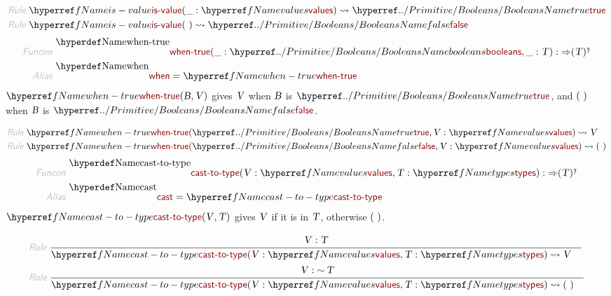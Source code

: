 \begin{align*}
  \KEY{Rule} ~ 
    & \NAMEREF{is-value}
        ( \_ : \NAMEREF{values} ) \leadsto
        \NAMEHYPER{../Primitive}{Booleans}{true}
\\
  \KEY{Rule} ~ 
    & \NAMEREF{is-value}
        (  ~  ) \leadsto
        \NAMEHYPER{../Primitive}{Booleans}{false}
\end{align*}
\begin{align*}
  \KEY{Funcon} ~ 
  & \NAMEDECL{when-true}(\_ : \NAMEHYPER{../Primitive}{Booleans}{booleans}, \_ : \VAR{T}) :  \TO ( \VAR{T} )\QUERY
\\
  \KEY{Alias} ~ 
  & \NAMEDECL{when} = \NAMEREF{when-true}
\end{align*}
$\SHADE{\NAMEREF{when-true}
           ( \VAR{B},   
             \VAR{V} )}$ gives $\SHADE{\VAR{V}}$ when $\SHADE{\VAR{B}}$ is $\SHADE{\NAMEHYPER{../Primitive}{Booleans}{true}}$, and $\strut(  ~  )\strut$ when $\SHADE{\VAR{B}}$ is $\SHADE{\NAMEHYPER{../Primitive}{Booleans}{false}}$.

\begin{align*}
  \KEY{Rule} ~ 
    & \NAMEREF{when-true}
        ( \NAMEHYPER{../Primitive}{Booleans}{true},   
          \VAR{V} : \NAMEREF{values} ) \leadsto
        \VAR{V}
\\
  \KEY{Rule} ~ 
    & \NAMEREF{when-true}
        ( \NAMEHYPER{../Primitive}{Booleans}{false},   
          \VAR{V} : \NAMEREF{values} ) \leadsto
        (  ~  )
\end{align*}
\begin{align*}
  \KEY{Funcon} ~ 
  & \NAMEDECL{cast-to-type}(\VAR{V} : \NAMEREF{values}, \VAR{T} : \NAMEREF{types}) :  \TO ( \VAR{T} )\QUERY
\\
  \KEY{Alias} ~ 
  & \NAMEDECL{cast} = \NAMEREF{cast-to-type}
\end{align*}
$\SHADE{\NAMEREF{cast-to-type}
           ( \VAR{V},   
             \VAR{T} )}$ gives $\SHADE{\VAR{V}}$ if it is in $\SHADE{\VAR{T}}$, otherwise $\strut(  ~  )\strut$.

\begin{align*}
  \KEY{Rule} ~ 
    & \RULE{
       \VAR{V} : \VAR{T}
      }{
      & \NAMEREF{cast-to-type}
          ( \VAR{V} : \NAMEREF{values},   
            \VAR{T} : \NAMEREF{types} ) \leadsto
          \VAR{V}
      }
\\
  \KEY{Rule} ~ 
    & \RULE{
       \VAR{V} : \mathop{\sim} \VAR{T}
      }{
      & \NAMEREF{cast-to-type}
          ( \VAR{V} : \NAMEREF{values},   
            \VAR{T} : \NAMEREF{types} ) \leadsto
          (  ~  )
      }
\end{align*}
